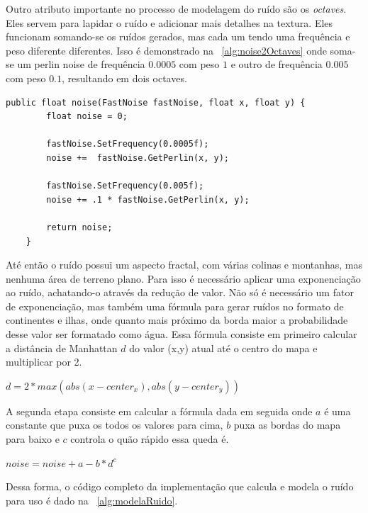 \documentclass[12pt, 
openright, 
oneside, 
a4paper,    
brazil]{facom-ufu-abntex2}
\begin{document}
Outro atributo importante no processo de modelagem do ruído são os \textit{octaves}. Eles servem para lapidar o ruído e adicionar mais detalhes na textura. Eles funcionam somando-se os ruídos gerados, mas cada um tendo uma frequência e peso diferente diferentes. Isso é demonstrado na \lstlistingname~\ref{alg:noise2Octaves} onde soma-se um perlin noise de frequência $0.0005$ com peso $1$ e outro de frequência $0.005$ com peso $0.1$, resultando em dois octaves.

\begin{lstlisting}[caption=Implementação do ruído que usa o perlin noise com dois octaves, label={alg:noise2Octaves}]
public float noise(FastNoise fastNoise, float x, float y) {
		float noise = 0;
		
		fastNoise.SetFrequency(0.0005f);	
		noise +=  fastNoise.GetPerlin(x, y);

		fastNoise.SetFrequency(0.005f);
		noise += .1 * fastNoise.GetPerlin(x, y);
		
		return noise;
	}
\end{lstlisting}   

Até então o ruído possui um aspecto fractal, com várias colinas e montanhas, mas nenhuma área de terreno plano. Para isso é necessário aplicar uma exponenciação ao ruído, achatando-o através da redução de valor. Não só é necessário um fator de exponenciação, mas também uma fórmula para gerar ruídos no formato de continentes e ilhas, onde quanto mais próximo da borda maior a probabilidade desse valor ser formatado como água. Essa fórmula consiste em primeiro calcular a distância de Manhattan $d$ do valor (x,y) atual até o centro do mapa e multiplicar por 2.

$d = 2*max(abs(x - center_x), abs(y - center_y))$

A segunda etapa consiste em calcular a fórmula dada em seguida \cite{NoiseRedBlob} onde $a$ é uma constante que puxa os todos os valores para cima, $b$ puxa as bordas do mapa para baixo e $c$ controla o quão rápido essa queda é.

$ noise = noise + a - b*d^c$

Dessa forma, o código completo da implementação que calcula e modela o ruído para uso é dado na \lstlistingname~\ref{alg:modelaRuido}.
\end{document}
